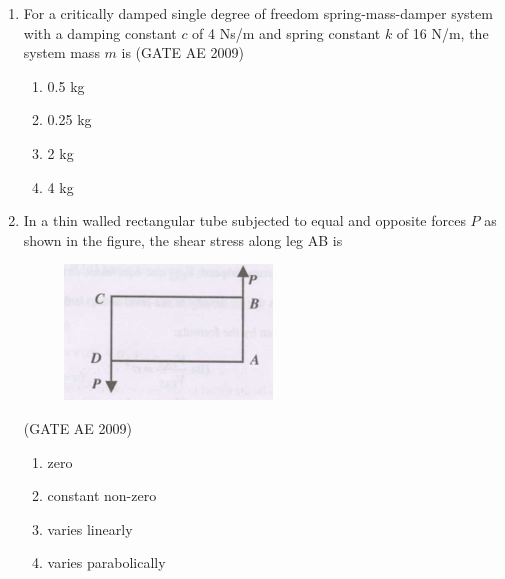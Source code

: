 \documentclass[journal,12pt,onecolumn]{IEEEtran}
\theoremstyle{remark}
\begin{document}
\begin{flushleft}
\begin{enumerate}
\item 
For a critically damped single degree of freedom spring-mass-damper system with a damping constant \(c\) of 4 Ns/m and spring constant \(k\) of 16 N/m, the system mass \(m\) is
\hfill(GATE AE 2009)
\begin{multicols}{2}
\begin{enumerate}
\item 0.5 kg
\item 0.25 kg
\item 2 kg
\item 4 kg
\end{enumerate}
\end{multicols}

\item 
In a thin walled rectangular tube subjected to equal and opposite forces \(P\) as shown in the figure, the shear stress along leg AB is  
\begin{figure}[H]
    \centering
    \includegraphics[width=0.5\columnwidth]{figs/19.png}
    \caption{}
    \label{fig:placeholder}
\end{figure}
\hfill(GATE AE 2009)
\begin{multicols}{2}
\begin{enumerate}
\item zero
\item constant non-zero
\item varies linearly
\item varies parabolically
\end{enumerate}
\end{multicols}


\end{enumerate}
\end{flushleft}
\end{document}
